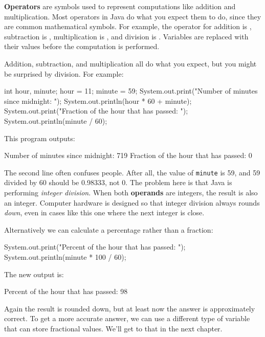 
{\bf Operators} are symbols used to represent computations like addition and multiplication.
Most operators in Java do what you expect them to do, since they are common mathematical symbols.
For example, the operator for addition is \java{+}, subtraction is \java{-}, multiplication is \java{*}, and division is \java{/}.
Variables are replaced with their values before the computation is performed.

Addition, subtraction, and multiplication all do what you expect, but you might be surprised by division.
For example:

\begin{code}
    int hour, minute;
    hour = 11;
    minute = 59;
    System.out.print("Number of minutes since midnight: ");
    System.out.println(hour * 60 + minute);
    System.out.print("Fraction of the hour that has passed: ");
    System.out.println(minute / 60);
\end{code}

This program outputs:

\begin{stdout}
Number of minutes since midnight: 719
Fraction of the hour that has passed: 0
\end{stdout}


The second line often confuses people.
After all, the value of {\tt minute} is 59, and 59 divided by 60 should be 0.98333, not 0.
The problem here is that Java is performing {\em integer division}.
When both {\bf operands} are integers, the result is also an integer.
Computer hardware is designed so that integer division always rounds {\em down}, even in cases like this one where the next integer is close.

Alternatively we can calculate a percentage rather than a fraction:

\begin{code}
    System.out.print("Percent of the hour that has passed: ");
    System.out.println(minute * 100 / 60);
\end{code}

The new output is:

\begin{stdout}
Percent of the hour that has passed: 98
\end{stdout}

Again the result is rounded down, but at least now the answer is approximately correct.
To get a more accurate answer, we can use a different type of variable that can store fractional values.
We'll get to that in the next chapter.


